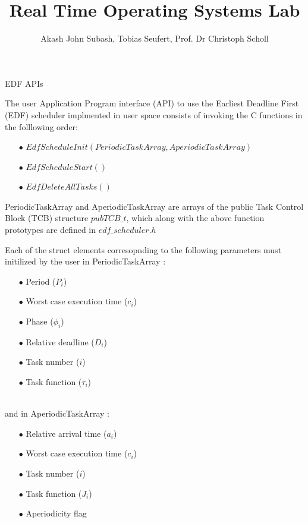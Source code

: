 \documentclass[10pt]{beamer}
\title[Real Time Operating Systems Lab]{ Real Time Operating Systems Lab}
\author {Akash John Subash, Tobias Seufert, Prof. Dr Christoph Scholl}
\institute {Chair of Operating Systems}
\begin{document}
\begin{frame}{\small{EDF APIs}}
	\footnotesize{
		 The user Application Program interface (API) to use the Earliest Deadline First (EDF) scheduler implmented in user space consists of invoking the C functions in the folllowing order:\\
	\begin{itemize}
		\item[$\bullet$] $EdfScheduleInit(PeriodicTaskArray, AperiodicTaskArray)$\\
		\item[$\bullet$] $EdfScheduleStart()$\\
		\item[$\bullet$] $EdfDeleteAllTasks()$\\
	\end{itemize}

	 PeriodicTaskArray and AperiodicTaskArray are arrays of the public Task Control Block (TCB) structure $pubTCB\_t$, which along with the above function prototypes are defined in $edf\_scheduler.h$\\
	}%
\end{frame}

\begin{frame}
	\footnotesize{
	Each of the struct elements corresopnding to the following parameters must initilized by the user in PeriodicTaskArray :\\
	\begin{itemize}
		\item[$\bullet$] Period ($P_{i}$) \\
		\item[$\bullet$] Worst case execution time ($c_{i}$) \\
		\item[$\bullet$] Phase ($\phi_{i}$)\\
		\item[$\bullet$] Relative deadline ($D_{i}$)
		\item[$\bullet$] Task number (${i}$)\\
		\item[$\bullet$] Task function ($\tau_{i}$)\\
	\end{itemize}\\
		
	\hfill\break
	and in AperiodicTaskArray :\\
	\begin{itemize}
		\item[$\bullet$] Relative arrival time ($a_{i}$) \\
		\item[$\bullet$] Worst case execution time  ($c_{i}$)\\
		\item[$\bullet$] Task number (${i}$)\\
		\item[$\bullet$] Task function ($J_{i}$)\\
		\item[$\bullet$] Aperiodicity flag\\
	\end{itemize}
	} %
\end{frame}
\end{document}
